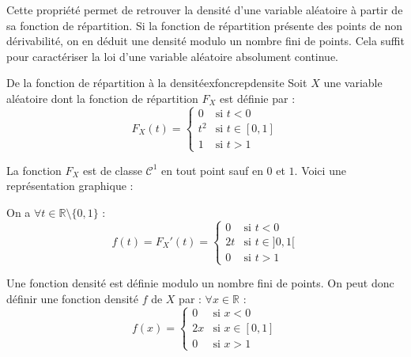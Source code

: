 Cette propriété permet de retrouver la densité d'une variable aléatoire à partir de sa fonction de répartition. Si la fonction de répartition présente des points de non dérivabilité, on en déduit une densité modulo un nombre fini de points. Cela suffit pour caractériser la loi d'une variable aléatoire absolument continue. 

\begin{exemple}{De la fonction de répartition à la densité}{exfoncrepdensite}
	Soit $X$ une variable aléatoire dont la fonction de répartition $F_X$ est définie par : \[
	F_X(t) = \begin{cases}
	0 & \text{si } t < 0 \\
	t^2 & \text{si } t \in [0, 1] \\
	1 & \text{si } t > 1
	\end{cases}
	\]
	
	La fonction $F_X$ est de classe $\mathcal{C}^1$ en tout point sauf en $0$ et $1$. 
	Voici une représentation graphique :
	
	\begin{center}
	\end{center}
	
	On a $\forall t \in \mathbb{R}\setminus \{0,1\}$ : \[
	f(t) = F_X'(t) = \begin{cases}
	0 & \text{si } t < 0 \\
	2t & \text{si } t \in ]0, 1[ \\
	0 & \text{si } t > 1
	\end{cases}
	\]
	
	Une fonction densité est définie modulo un nombre fini de points. On peut donc définir une fonction densité $f$ de $X$ par : $\forall x \in \mathbb{R}$ : \[
	f(x) = \begin{cases}
	0 & \text{si } x < 0 \\
	2x & \text{si } x \in [0, 1] \\
	0 & \text{si } x > 1
	\end{cases}
	\]
	

\end{exemple}
